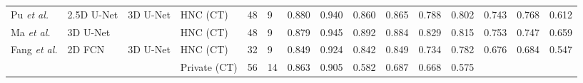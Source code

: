\documentclass[lettersize,journal]{IEEEtran}
\begin{document}
{\begin{table*}[ht!]
{\begin{tabular}{@{}lllllllllllllll@{}}
\multirow{2}{*}{Pu {\it{et al.}} \cite{124}}        & \multirow{2}{*}{2.5D U-Net} & \multirow{2}{*}{3D U-Net} & \multirow{2}{*}{HNC (CT) \cite{30}} & \multirow{2}{*}{48}       & \multirow{2}{*}{9}          & \multirow{2}{*}{0.880}     & \multirow{2}{*}{0.940}    & \multirow{2}{*}{0.860} & \multirow{2}{*}{0.865} & \multirow{2}{*}{0.788} & \multirow{2}{*}{0.802} & \multirow{2}{*}{0.743} & \multirow{2}{*}{0.768} & \multirow{2}{*}{0.612}  \\
                                            &                             &                           &                                    &                           &                             &                            &                           &                        &                        &                        &                        &                        &                        &                         \\
\multirow{2}{*}{Ma {\it{et al.}} \cite{125}}       & \multirow{2}{*}{3D U-Net}   & \multirow{2}{*}{}         & \multirow{2}{*}{HNC (CT) \cite{30}} & \multirow{2}{*}{48}       & \multirow{2}{*}{9}          & \multirow{2}{*}{0.879}     & \multirow{2}{*}{0.945}    & \multirow{2}{*}{0.892} & \multirow{2}{*}{0.884} & \multirow{2}{*}{0.829} & \multirow{2}{*}{0.815} & \multirow{2}{*}{0.753} & \multirow{2}{*}{0.747} & \multirow{2}{*}{0.659}  \\
                                            &                             &                           &                                    &                           &                             &                            &                           &                        &                        &                        &                        &                        &                        &                         \\
\multirow{2}{*}{Fang {\it{et al.}} \cite{109}}      & \multirow{2}{*}{2D FCN}     & \multirow{2}{*}{3D U-Net} & HNC (CT) \cite{30}                  & 32                        & 9                           & 0.849                      & 0.924                     & 0.842                  & 0.849                  & 0.734                  & 0.782                  & 0.676                  & 0.684                  & 0.547                   \\
                                            &                             &                           & Private (CT)                       & 56                        & 14                          & 0.863                      & 0.905                     & 0.582                  & 0.687                  & 0.668                  & 0.575                  &                        &                        &                         \\ \bottomrule
\end{tabular}%
}
\end{table*}

}
\end{document}
